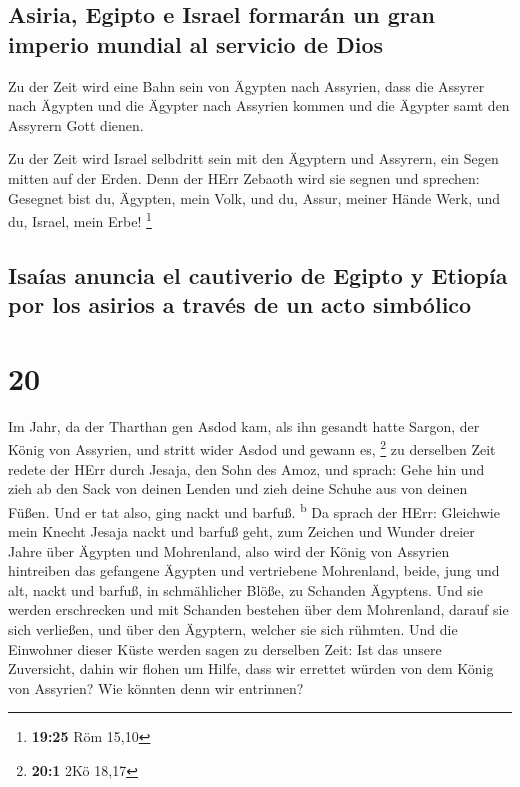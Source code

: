 \hypertarget{asiria-egipto-e-israel-formaruxe1n-un-gran-imperio-mundial-al-servicio-de-dios}{%
\subsection{Asiria, Egipto e Israel formarán un gran imperio mundial al
servicio de
Dios}\label{asiria-egipto-e-israel-formaruxe1n-un-gran-imperio-mundial-al-servicio-de-dios}}

 Zu der Zeit wird eine Bahn sein von Ägypten nach
Assyrien, dass die Assyrer nach Ägypten und die Ägypter nach Assyrien
kommen und die Ägypter samt den Assyrern Gott dienen.

 Zu der Zeit wird Israel selbdritt sein mit den Ägyptern
und Assyrern, ein Segen mitten auf der Erden.  Denn der
HErr Zebaoth wird sie segnen und sprechen: Gesegnet bist du, Ägypten,
mein Volk, und du, Assur, meiner Hände Werk, und du, Israel, mein Erbe!
\footnote{\textbf{19:25} Röm 15,10}

\hypertarget{isauxedas-anuncia-el-cautiverio-de-egipto-y-etiopuxeda-por-los-asirios-a-travuxe9s-de-un-acto-simbuxf3lico}{%
\subsection{Isaías anuncia el cautiverio de Egipto y Etiopía por los
asirios a través de un acto
simbólico}\label{isauxedas-anuncia-el-cautiverio-de-egipto-y-etiopuxeda-por-los-asirios-a-travuxe9s-de-un-acto-simbuxf3lico}}

\hypertarget{section-19}{%
\section{20}\label{section-19}}

 Im Jahr, da der Tharthan gen Asdod kam, als ihn gesandt
hatte Sargon, der König von Assyrien, und stritt wider Asdod und gewann
es, \footnote{\textbf{20:1} 2Kö 18,17}  zu derselben Zeit
redete der HErr durch Jesaja, den Sohn des Amoz, und sprach: Gehe hin
und zieh ab den Sack von deinen Lenden und zieh deine Schuhe aus von
deinen Füßen. Und er tat also, ging nackt und barfuß.
\textsuperscript{b}  Da sprach der HErr: Gleichwie mein
Knecht Jesaja nackt und barfuß geht, zum Zeichen und Wunder dreier Jahre
über Ägypten und Mohrenland,  also wird der König von
Assyrien hintreiben das gefangene Ägypten und vertriebene Mohrenland,
beide, jung und alt, nackt und barfuß, in schmählicher Blöße, zu
Schanden Ägyptens.  Und sie werden erschrecken und mit
Schanden bestehen über dem Mohrenland, darauf sie sich verließen, und
über den Ägyptern, welcher sie sich rühmten.  Und die
Einwohner dieser Küste werden sagen zu derselben Zeit: Ist das unsere
Zuversicht, dahin wir flohen um Hilfe, dass wir errettet würden von dem
König von Assyrien? Wie könnten denn wir entrinnen?

